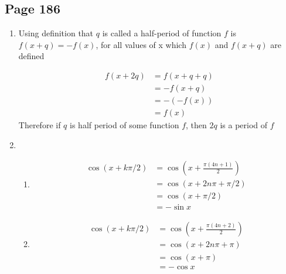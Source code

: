\documentclass{article}
\newenvironment{solutions}[1]
{\subsection*{#1}
 \begin{enumerate}[leftmargin=1.5em]}
{\end{enumerate}}
\newcommand{\solution}{\item}
\newenvironment{subsolutions}
{\begin{enumerate}}
{\end{enumerate}}
\newcommand{\subsolution}{\item}
\begin{document}
\begin{solutions}{Page 186}
Which can be seen that $\cos(x+\pi)$ is the same as $-\cos (x)$, therefore by definition, $\cos x$ has a half-period of $\pi$ radians

For $y = \tan x$
\begin{align*}
    \tan (x + \pi) &= \frac{\sin (x+\pi)}{\cos (x+\pi)}\\
           &= \frac{-\sin x}{-\cos x}\\
           &= \tan x
\end{align*}
So $\pi$ is period of $y=\tan x$ 

For $y=\cot x$
\begin{align*}
    \cot (x + \pi) &= \frac{\cos (x+\pi)}{\sin (x+\pi)}\\
           &= \frac{-\cos x}{-\sin x}\\
           &= \cot x
\end{align*}

So $\pi$ is period of $y=\cot x$ 

\solution
Using definition that $q$ is called a half-period of function $f$ is $f(x+q)= -f(x)$, for all values of x which $f(x)$ and $f(x+q)$ are defined

\begin{align*}
    f(x+2q) &= f\left(x+q+q \right)\\
            &= -f\left(x+q \right)\\
            &= -\left(-f(x)\right)\\
            &= f(x)
\end{align*}
Therefore if $q$ is half period of some function $f$, then $2q$ is a period of $f$

\solution
\begin{subsolutions}

\subsolution
\begin{align*}
    \cos \left( x+k\pi/2  \right) &= \cos \left( x+ \frac{\pi(4n+1)}{2}\right) \\
              &= \cos \left( x+ 2n\pi + \pi/2  \right)\\
              &= \cos (x+ \pi/2)\\
              &= -\sin x
\end{align*}

\subsolution
\begin{align*}
    \cos \left( x+k\pi/2  \right) &= \cos \left( x+ \frac{\pi(4n+2)}{2}\right) \\
              &= \cos \left( x+ 2n\pi + \pi  \right)\\
              &= \cos (x+ \pi)\\
              &= -\cos x
\end{align*}


\end{subsolutions}
\end{solutions}
\end{document}
